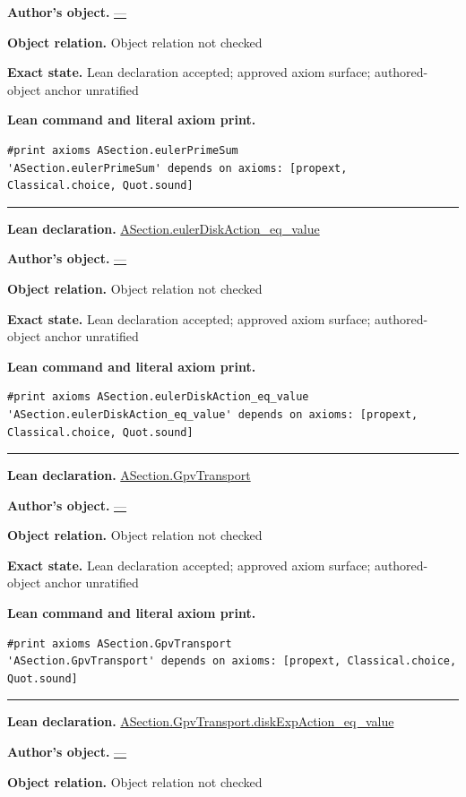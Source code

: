 \documentclass[11pt]{article}
\theoremstyle{plain}
\theoremstyle{definition}
\theoremstyle{remark}
\begin{document}
\begin{tcolorbox}
\par\textbf{Author's object.} \url{—}
\par\textbf{Object relation.} Object relation not checked
\par\textbf{Exact state.} Lean declaration accepted; approved axiom surface; authored-object anchor unratified
\par\smallskip\textbf{Lean command and literal axiom print.}
\begin{Verbatim}[breaklines=true,breakanywhere=true,fontsize=\small]
#print axioms ASection.eulerPrimeSum
'ASection.eulerPrimeSum' depends on axioms: [propext, Classical.choice, Quot.sound]
\end{Verbatim}
\medskip\hrule\medskip
\textbf{Lean declaration.} \url{ASection.eulerDiskAction_eq_value}
\par\textbf{Author's object.} \url{—}
\par\textbf{Object relation.} Object relation not checked
\par\textbf{Exact state.} Lean declaration accepted; approved axiom surface; authored-object anchor unratified
\par\smallskip\textbf{Lean command and literal axiom print.}
\begin{Verbatim}[breaklines=true,breakanywhere=true,fontsize=\small]
#print axioms ASection.eulerDiskAction_eq_value
'ASection.eulerDiskAction_eq_value' depends on axioms: [propext, Classical.choice, Quot.sound]
\end{Verbatim}
\medskip\hrule\medskip
\textbf{Lean declaration.} \url{ASection.GpvTransport}
\par\textbf{Author's object.} \url{—}
\par\textbf{Object relation.} Object relation not checked
\par\textbf{Exact state.} Lean declaration accepted; approved axiom surface; authored-object anchor unratified
\par\smallskip\textbf{Lean command and literal axiom print.}
\begin{Verbatim}[breaklines=true,breakanywhere=true,fontsize=\small]
#print axioms ASection.GpvTransport
'ASection.GpvTransport' depends on axioms: [propext, Classical.choice, Quot.sound]
\end{Verbatim}
\medskip\hrule\medskip
\textbf{Lean declaration.} \url{ASection.GpvTransport.diskExpAction_eq_value}
\par\textbf{Author's object.} \url{—}
\par\textbf{Object relation.} Object relation not checked

\end{tcolorbox}
\end{document}
